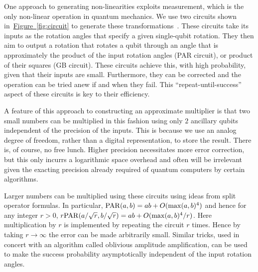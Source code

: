 \documentclass[conference]{IEEEtran}
\newcommand{\eq}[1]{Eq.~\hyperref[eq:#1]{(\ref*{eq:#1})}}
\newcommand{\fig}[1]{\hyperref[fig:#1]{Figure~\ref*{fig:#1}}}
\newcommand{\nix}[1]{{}}
\begin{document}
\nix{
Our solution to this problem is inspired in part from the Fourier adder.  The Fourier adder takes advantage of the fact that, for any $(a,b) \in \mathbb{R}^2$
\begin{equation}
e^{ia Z} e^{ib Z} =e^{i(a+b)Z}.\label{eq:phaseadd}
\end{equation}
This shows that if $f(x)$ is a sum then we can use this structure to implement~\eq{target} without requiring any additional ancillae.  However, in order to do this for more general functions we need to have the ability to perform a non-linear operation, such as multiplication.  Since quantum mechanics is a linear theory such non-linear operations a challenge to devise.
}

One approach to generating non-linearities exploits measurement, which is the only non-linear operation in quantum mechanics.  We use two circuits shown in~\fig{circuit} to generate these transformations~\cite{WR16}.  These circuits take its inputs as the rotation angles that specify a given single-qubit rotation.  They then aim to output a rotation that rotates a qubit through an angle that is approximately the product of the input rotation angles (PAR circuit), or product of their squares (GB circuit).  These circuits achieve this, with high probability, given that their inputs are small.  Furthermore, they can be corrected and the operation can be tried anew if and when they fail.  This ``repeat-until-success'' aspect of these circuits is key to their efficiency.

A feature of this approach to constructing an approximate multiplier is that two small numbers can be multiplied in this fashion using only $2$ ancillary qubits independent of the precision of the inputs.  This is because we use an analog degree of freedom, rather than a digital representation, to store the result.  There is, of course, no free lunch.  Higher precision necessitates more error correction, but this only incurrs a logarithmic space overhead and often will be irrelevant given the exacting precision already required of quantum computers by certain algorithms.

Larger numbers can be multiplied using these circuits using ideas from split operator formulas.  In particular, ${\rm PAR}( a,b) = ab + O(\max(a,b)^4)$ and hence for any integer $r>0$,
$r{\rm PAR}(a/\sqrt{r},b/\sqrt{r})=ab + O(\max(a,b)^4/r)$.  Here multiplication by $r$ is implemented by repeating the circuit $r$ times.  Hence by taking $r\rightarrow \infty$ the error can be made arbitrarily small.  Similar tricks, used in concert with an algorithm called oblivious amplitude amplification, can be used to make the success probability asymptotically independent of the input rotation angles.
\end{document}
